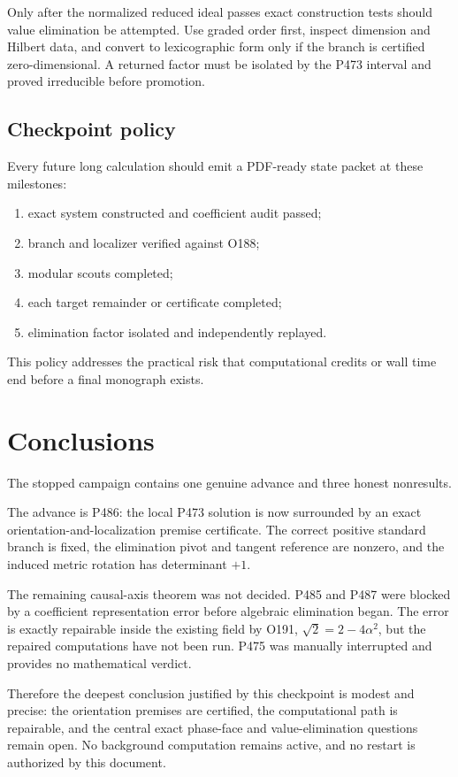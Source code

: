 \documentclass[11pt,a4paper,openany]{report}
\begin{document}
Only after the normalized reduced ideal passes exact construction tests
should value elimination be attempted. Use graded order first, inspect
dimension and Hilbert data, and convert to lexicographic form only if the
branch is certified zero-dimensional. A returned factor must be isolated by
the P473 interval and proved irreducible before promotion.

\section{Checkpoint policy}

Every future long calculation should emit a PDF-ready state packet at these
milestones:
\begin{enumerate}
\item exact system constructed and coefficient audit passed;
\item branch and localizer verified against O188;
\item modular scouts completed;
\item each target remainder or certificate completed;
\item elimination factor isolated and independently replayed.
\end{enumerate}
This policy addresses the practical risk that computational credits or wall
time end before a final monograph exists.

\chapter{Conclusions}

The stopped campaign contains one genuine advance and three honest
nonresults.

The advance is P486: the local P473 solution is now surrounded by an exact
orientation-and-localization premise certificate. The correct positive
standard branch is fixed, the elimination pivot and tangent reference are
nonzero, and the induced metric rotation has determinant \(+1\).

The remaining causal-axis theorem was not decided. P485 and P487 were blocked
by a coefficient representation error before algebraic elimination began.
The error is exactly repairable inside the existing field by O191,
\(\sqrt2=2-4\alpha^2\), but the repaired computations have not been run.
P475 was manually interrupted and provides no mathematical verdict.

Therefore the deepest conclusion justified by this checkpoint is modest and
precise: the orientation premises are certified, the computational path is
repairable, and the central exact phase-face and value-elimination questions
remain open. No background computation remains active, and no restart is
authorized by this document.
\end{document}
